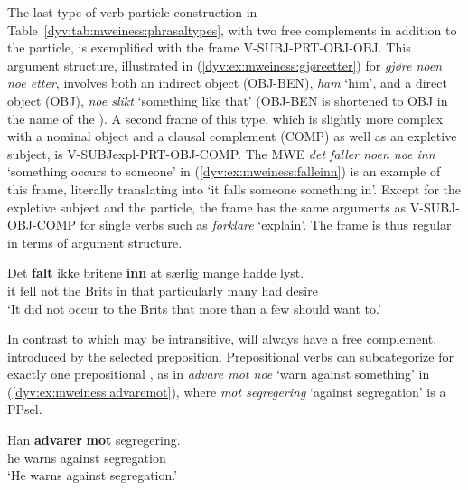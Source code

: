 \documentclass[output=paper]{langsci/langscibook}
\begin{document}
The last type of verb-particle construction in Table~\ref{dyv:tab:mweiness:phrasaltypes}, with two free complements in addition to the particle, is exemplified with the frame V-SUBJ-PRT-OBJ-OBJ.
This argument structure, illustrated in (\ref{dyv:ex:mweiness:gjøreetter}) for \emph{gjøre noen noe etter}, involves both an indirect object (OBJ-BEN), \emph{ham} `him', and a direct object (OBJ), \emph{noe slikt} `something like that' (OBJ-BEN is shortened to OBJ in the name of the ).
A second frame of this type, which is slightly more complex with a nominal object and a clausal complement (COMP) as well as an expletive subject, is V-SUBJexpl-PRT-OBJ-COMP. 
The MWE \emph{det faller noen noe inn} `something occurs to someone' in (\ref{dyv:ex:mweiness:falleinn}) is an example of this frame, literally translating into `it falls someone something in'.
Except for the expletive subject and the particle, the frame has the same arguments as V-SUBJ-OBJ-COMP for single verbs such as \emph{forklare} `explain'.
The frame is thus regular in terms of argument structure.   

\ea\label{dyv:ex:mweiness:falleinn}
\gll   Det \textbf{falt} ikke britene \textbf{inn} at særlig mange hadde lyst. \\
        it fell not {the Brits} in that particularly many had desire \\
\glt  `It did not occur to the Brits that more than a few should want to.' \\ 
\z

In contrast to  which may be intransitive,  will always have a free complement, introduced by the selected preposition.
Prepositional verbs can subcategorize for exactly one prepositional , as in
\emph{advare mot noe} `warn against something' in (\ref{dyv:ex:mweiness:advaremot}), where \emph{mot segregering} `against segregation' is a PPsel. 

\ea\label{dyv:ex:mweiness:advaremot}
\gll   Han \textbf{advarer} \textbf{mot} segregering. \\
        he warns against segregation\\
\glt  `He warns against segregation.' \\ 
\z
\end{document}
